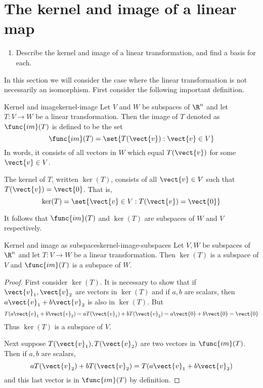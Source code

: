 \section{The kernel and image of a linear map}

\begin{outcome}
  \begin{enumerate}
  \item Describe the kernel and image of a linear transformation, and
    find a basis for each.
  \end{enumerate}
\end{outcome}

In this section we will consider the case where the linear transformation is not necessarily an
isomorphism. First consider the following important definition.

\begin{definition}{Kernel and image}{kernel-image}
Let $V$ and $W$ be subspaces of $\R^n$ and let $T:V\to W$ be a linear transformation. Then the image of $T$
denoted as $\func{im}(T) $ is defined to be the set 
\begin{equation*}
\func{im}(T) = \set{T (\vect{v}):\vect{v}\in V}
\end{equation*}
In words, it consists of all vectors in $W$ which equal $T(\vect{v})$ for some $
\vect{v}\in V$.

The kernel of $T$, written $\ker (T)$, consists of all $\vect{v}\in V$ such that $T(\vect{v})=\vect{0}$. That is, 
\begin{equation*}
\ker (T) =\set{\vect{v}\in V:T(\vect{v})=\vect{0}}
\end{equation*}
\end{definition}

It follows that $\func{im}(T) $ and $\ker (T) $
are subspaces of $W$ and $V$ respectively.

\begin{proposition}{Kernel and image as subspaces}{kernel-image-subspaces}
Let $V, W$ be subspaces of $\R^n$ and let $T:V\rightarrow W$ be a linear transformation. Then $\ker (
T) $ is a subspace of $V$ and $\func{im}(T) $ is a
subspace of $W$.
\end{proposition}

\begin{proof}
First consider $\ker (T)$. It is necessary to
show that if $\vect{v}_{1},\vect{v}_{2}$ are vectors in $\ker (T) $
and if $a,b$ are scalars, then $a\vect{v}_{1}+b\vect{v}_{2}$ is also in $\ker
(T)$. But 
\begin{equation*}
T(a\vect{v}_{1}+b\vect{v}_{2}) =aT(\vect{v}_{1})+bT(\vect{v}_{2})=a\vect{0}+b\vect{0}=\vect{0}
\end{equation*}
Thus $\ker (T) $ is a subspace of $V$.

Next suppose $T(\vect{v}_{1}),T(\vect{v}_{2})$ are two vectors in $\func{im}(
T)$. Then if $a,b$ are scalars, 
\begin{equation*}
aT(\vect{v}_{2})+bT(\vect{v}_{2})=T(a\vect{v}_{1}+b\vect{v}_{2})
\end{equation*}
and this last vector is in $\func{im}(T) $ by definition. 
\end{proof}

